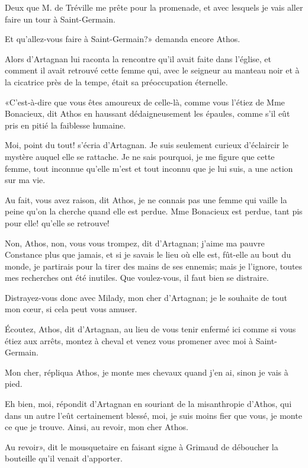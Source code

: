 \speak  Deux que M. de Tréville me prête pour la promenade, et avec lesquels je vais aller faire un tour à Saint-Germain. 

\speak  Et qu'allez-vous faire à Saint-Germain?» demanda encore Athos. 

Alors d'Artagnan lui raconta la rencontre qu'il avait faite dans l'église, et comment il avait retrouvé cette femme qui, avec le seigneur au manteau noir et à la cicatrice près de la tempe, était sa préoccupation éternelle. 

«C'est-à-dire que vous êtes amoureux de celle-là, comme vous l'étiez de Mme Bonacieux, dit Athos en haussant dédaigneusement les épaules, comme s'il eût pris en pitié la faiblesse humaine. 

\speak  Moi, point du tout! s'écria d'Artagnan. Je suis seulement curieux d'éclaircir le mystère auquel elle se rattache. Je ne sais pourquoi, je me figure que cette femme, tout inconnue qu'elle m'est et tout inconnu que je lui suis, a une action sur ma vie. 

\speak  Au fait, vous avez raison, dit Athos, je ne connais pas une femme qui vaille la peine qu'on la cherche quand elle est perdue. Mme Bonacieux est perdue, tant pis pour elle! qu'elle se retrouve! 

\speak  Non, Athos, non, vous vous trompez, dit d'Artagnan; j'aime ma pauvre Constance plus que jamais, et si je savais le lieu où elle est, fût-elle au bout du monde, je partirais pour la tirer des mains de ses ennemis; mais je l'ignore, toutes mes recherches ont été inutiles. Que voulez-vous, il faut bien se distraire. 

\speak  Distrayez-vous donc avec Milady, mon cher d'Artagnan; je le souhaite de tout mon cœur, si cela peut vous amuser. 

\speak  Écoutez, Athos, dit d'Artagnan, au lieu de vous tenir enfermé ici comme si vous étiez aux arrêts, montez à cheval et venez vous promener avec moi à Saint-Germain. 

\speak  Mon cher, répliqua Athos, je monte mes chevaux quand j'en ai, sinon je vais à pied. 

\speak  Eh bien, moi, répondit d'Artagnan en souriant de la misanthropie d'Athos, qui dans un autre l'eût certainement blessé, moi, je suis moins fier que vous, je monte ce que je trouve. Ainsi, au revoir, mon cher Athos. 

\speak  Au revoir», dit le mousquetaire en faisant signe à Grimaud de déboucher la bouteille qu'il venait d'apporter. 

